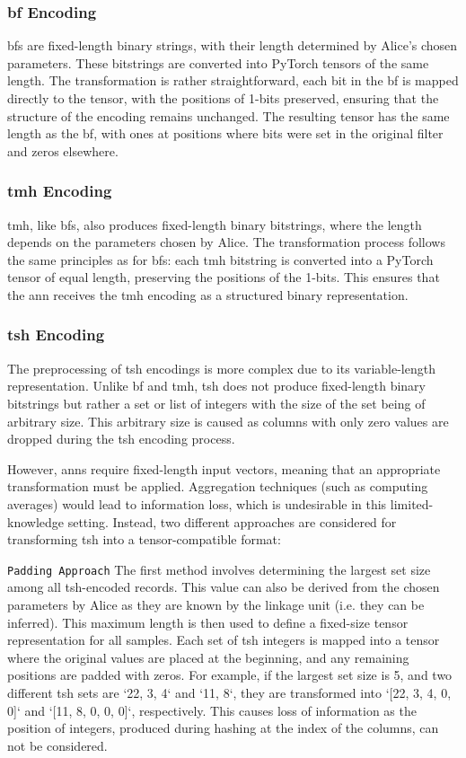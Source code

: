 \subsubsection{\ac{bf} Encoding}
\ac{bf}s are fixed-length binary strings, with their length determined by Alice’s chosen parameters.
These bitstrings are converted into PyTorch tensors of the same length.
The transformation is rather straightforward, each bit in the \ac{bf} is mapped directly to the tensor, with the positions of 1-bits preserved, ensuring that the structure of the encoding remains unchanged.
The resulting tensor has the same length as the \ac{bf}, with ones at positions where bits were set in the original filter and zeros elsewhere.

\subsubsection{\ac{tmh} Encoding}
\ac{tmh}, like \ac{bf}s, also produces fixed-length binary bitstrings, where the length depends on the parameters chosen by Alice.
The transformation process follows the same principles as for \ac{bf}s: each \ac{tmh} bitstring is converted into a PyTorch tensor of equal length, preserving the positions of the 1-bits.
This ensures that the \ac{ann} receives the \ac{tmh} encoding as a structured binary representation.

\subsubsection{\ac{tsh} Encoding}
The preprocessing of \ac{tsh} encodings is more complex due to its variable-length representation.
Unlike \ac{bf} and \ac{tmh}, \ac{tsh} does not produce fixed-length binary bitstrings but rather a set or list of integers with the size of the set being of arbitrary size.
This arbitrary size is caused as columns with only zero values are dropped during the \ac{tsh} encoding process.

However, \ac{ann}s require fixed-length input vectors, meaning that an appropriate transformation must be applied.
Aggregation techniques (such as computing averages) would lead to information loss, which is undesirable in this limited-knowledge setting.
Instead, two different approaches are considered for transforming \ac{tsh} into a tensor-compatible format:

\texttt{Padding Approach}
The first method involves determining the largest set size among all \ac{tsh}-encoded records.
This value can also be derived from the chosen parameters by Alice as they are known by the linkage unit (i.e. they can be inferred).
This maximum length is then used to define a fixed-size tensor representation for all samples.
Each set of \ac{tsh} integers is mapped into a tensor where the original values are placed at the beginning, and any remaining positions are padded with zeros.
For example, if the largest set size is 5, and two different \ac{tsh} sets are `{22, 3, 4}` and `{11, 8}`, they are transformed into `[22, 3, 4, 0, 0]` and `[11, 8, 0, 0, 0]`, respectively.
This causes loss of information as the position of integers, produced during hashing at the index of the columns, can not be considered.

